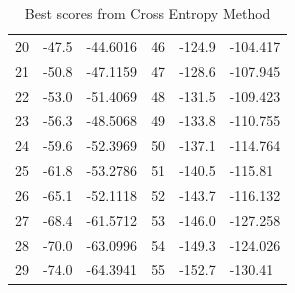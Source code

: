 \documentclass[conference,letterpaper]{IEEEtran}
\begin{document}
\begin{table}[!ht]
\begin{tabularx}{\columnwidth}{XXXXXX}
    20 & -47.5   & -44.6016   & 46 & -124.9  & -104.417   \\
    21 & -50.8   & -47.1159   & 47 & -128.6  & -107.945   \\
    22 & -53.0   & -51.4069   & 48 & -131.5  & -109.423   \\
    23 & -56.3   & -48.5068   & 49 & -133.8  & -110.755   \\
    24 & -59.6   & -52.3969   & 50 & -137.1  & -114.764   \\
    25 & -61.8   & -53.2786   & 51 & -140.5  & -115.81    \\
    26 & -65.1   & -52.1118   & 52 & -143.7  & -116.132   \\
    27 & -68.4   & -61.5712   & 53 & -146.0  & -127.258   \\
    28 & -70.0   & -63.0996   & 54 & -149.3  & -124.026   \\
    29 & -74.0   & -64.3941   & 55 & -152.7  & -130.41    \\ \hline
    \end{tabularx}
    \caption{Best scores from Cross Entropy Method}
    \label{CE_Results}
\end{table}
\end{document}
